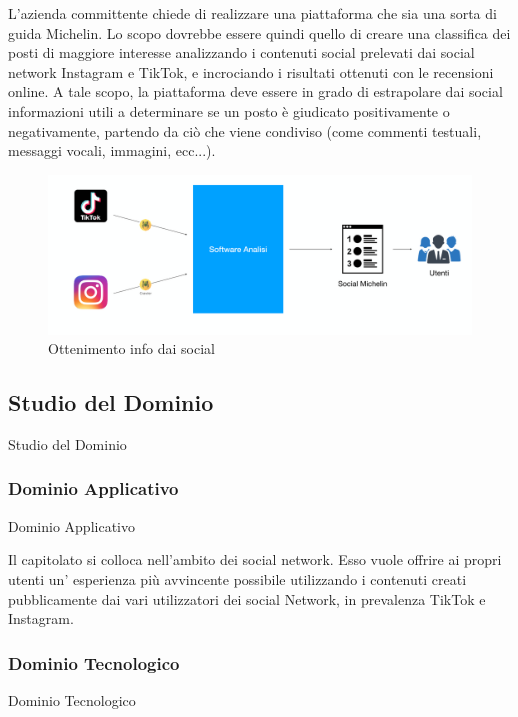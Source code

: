 \documentclass[11pt]{article}
\begin{document}
    L’azienda committente chiede di realizzare una piattaforma che sia una sorta di guida Michelin. Lo scopo dovrebbe essere quindi quello di creare una classifica dei posti di maggiore interesse analizzando i contenuti social prelevati dai social network Instagram e TikTok, e incrociando i risultati ottenuti con le recensioni online. A tale scopo, la piattaforma deve essere in grado di estrapolare dai social informazioni utili a determinare se un posto è giudicato positivamente o negativamente, partendo da ciò che viene condiviso (come commenti testuali, messaggi vocali, immagini, ecc...).
    
    \begin{figure}[h!]
        \centering
        \includegraphics[scale=0.4]{Res/C4.PNG}
        \caption{Ottenimento info dai social}
        \label{GuidaMIchelin}
    \end{figure}
    
    \subsection{Studio del Dominio} Studio del Dominio
        \subsubsection{Dominio Applicativo} Dominio Applicativo
        
        Il capitolato si colloca nell'ambito dei social network.
        Esso vuole offrire ai propri utenti un' esperienza più avvincente possibile utilizzando i contenuti creati pubblicamente dai vari utilizzatori dei social Network, in prevalenza TikTok e Instagram.
        \subsubsection{Dominio Tecnologico} Dominio Tecnologico
        
\end{document}
